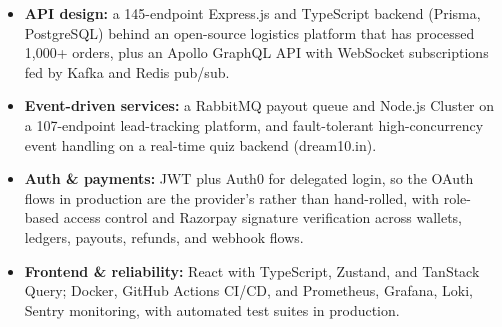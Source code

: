 \documentclass[]{cover}
\begin{document}


\currentdate{\today}



{\raggedright{}\fontsize{11pt}{13pt}\selectfont
\renewcommand{\labelitemi}{\textbullet}
\renewcommand{\labelitemii}{\textbullet}
\renewcommand{\labelitemiii}{\textbullet}
\begin{itemize}
    \item \textbf{API design:} a 145-endpoint Express.js and TypeScript backend (Prisma, PostgreSQL) behind an open-source logistics platform that has processed 1,000+ orders, plus an Apollo GraphQL API with WebSocket subscriptions fed by Kafka and Redis pub/sub.
    \item \textbf{Event-driven services:} a RabbitMQ payout queue and Node.js Cluster on a 107-endpoint lead-tracking platform, and fault-tolerant high-concurrency event handling on a real-time quiz backend (dream10.in).
    \item \textbf{Auth \& payments:} JWT plus Auth0 for delegated login, so the OAuth flows in production are the provider's rather than hand-rolled, with role-based access control and Razorpay signature verification across wallets, ledgers, payouts, refunds, and webhook flows.
    \item \textbf{Frontend \& reliability:} React with TypeScript, Zustand, and TanStack Query; Docker, GitHub Actions CI/CD, and Prometheus, Grafana, Loki, Sentry monitoring, with automated test suites in production.
\end{itemize}\par}
\end{document}
